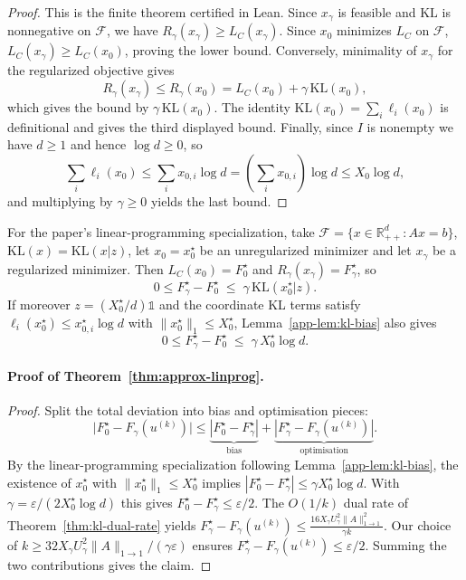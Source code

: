 \documentclass{article}
\theoremstyle{plain}
\newcommand{\ones}{\mathds{1}}
\newcommand{\RR}{\mathbb{R}}
\renewcommand{\epsilon}{\varepsilon}
\newcommand{\norm}[1]{\|#1\|}
\newcommand{\Umax}{U_\gamma}
\newcommand{\Xmax}{X_\gamma}
\newcommand{\XmaxZero}{X_0^\star}
\newcommand{\z}{z}
\newcommand{\KLdiv}[2]{\mathrm{KL}(#1|#2)}
\begin{document}
\begin{proof}
This is the finite theorem certified in Lean.  Since $x_\gamma$ is feasible and
$\mathrm{KL}$ is nonnegative on $\mathcal F$, we have
$R_\gamma(x_\gamma)\ge L_C(x_\gamma)$.  Since $x_0$ minimizes $L_C$ on
$\mathcal F$, $L_C(x_\gamma)\ge L_C(x_0)$, proving the lower bound.  Conversely,
minimality of $x_\gamma$ for the regularized objective gives
\[
  R_\gamma(x_\gamma)\le R_\gamma(x_0)
  =L_C(x_0)+\gamma\,\mathrm{KL}(x_0),
\]
which gives the bound by $\gamma\,\mathrm{KL}(x_0)$.  The identity
$\mathrm{KL}(x_0)=\sum_i\ell_i(x_0)$ is definitional and gives the third
displayed bound.  Finally, since $I$ is nonempty we have $d\ge1$ and hence
$\log d\ge0$, so
\[
  \sum_i\ell_i(x_0)
  \le
  \sum_i x_{0,i}\log d
  =
  \left(\sum_i x_{0,i}\right)\log d
  \le X_0\log d,
\]
and multiplying by $\gamma\ge0$ yields the last bound.
\end{proof}

For the paper's linear-programming specialization, take
$\mathcal F=\{x\in\RR_{++}^d:Ax=b\}$,
$\mathrm{KL}(x)=\KLdiv{x}{\z}$, let $x_0=x_0^\star$ be an unregularized
minimizer and let $x_\gamma$ be a regularized minimizer.  Then
$L_C(x_0)=F_0^\star$ and $R_\gamma(x_\gamma)=F_\gamma^\star$, so
\begin{equation}\label{app-eq:bias-abs-anymass}
  0 \le F_{\gamma}^{\star}-F_{0}^{\star}
  \;\le\;
  \gamma\,\KLdiv{x_0^\star}{\z}.
\end{equation}
If moreover $\z=(\XmaxZero/d)\ones$ and the coordinate KL terms satisfy
$\ell_i(x_0^\star)\le x_{0,i}^\star\log d$ with
$\|x_0^\star\|_1\le\XmaxZero$, Lemma~\ref{app-lem:kl-bias}
also gives
\begin{equation}\label{app-eq:bias-abs-constz}
  0 \le F_{\gamma}^{\star}-F_{0}^{\star}
  \;\le\;
  \gamma\,\XmaxZero\log d .
\end{equation}

\paragraph{Proof of Theorem~\ref{thm:approx-linprog}.}
\begin{proof}
Split the total deviation into bias and optimisation pieces:
\[
  \bigl|F_0^\star - F_\gamma(u^{(k)})\bigr|
   \le
  \underbrace{|F_0^\star - F_\gamma^\star|}_{\text{bias}}
   +
  \underbrace{|F_\gamma^\star - F_\gamma(u^{(k)})|}_{\text{optimisation}} .
\]
By the linear-programming specialization following Lemma~\ref{app-lem:kl-bias},
the existence of $x_0^\star$ with $\|x_0^\star\|_1\le \XmaxZero$ implies
$|F_0^\star - F_\gamma^\star| \le \gamma \XmaxZero\log d$. With $\gamma=\epsilon/(2 \XmaxZero\log d)$ this gives
$F_0^\star - F_\gamma^\star \le \epsilon/2$.
%
The $O(1/k)$ dual rate of Theorem~\ref{thm:kl-dual-rate} yields
$
  F_\gamma^\star - F_\gamma(u^{(k)})
   \le
  \frac{16 \Xmax \Umax^{2} \norm{A}_{1\to1}^{2}}{\gamma k}.
$
Our choice of
$k \ge 32 \Xmax \Umax^{2} \norm{A}_{1\to1}/(\gamma \epsilon)$
ensures $F_\gamma^\star - F_\gamma(u^{(k)})\le \epsilon/2$.
%
Summing the two contributions gives the claim.
\end{proof}
\end{document}

